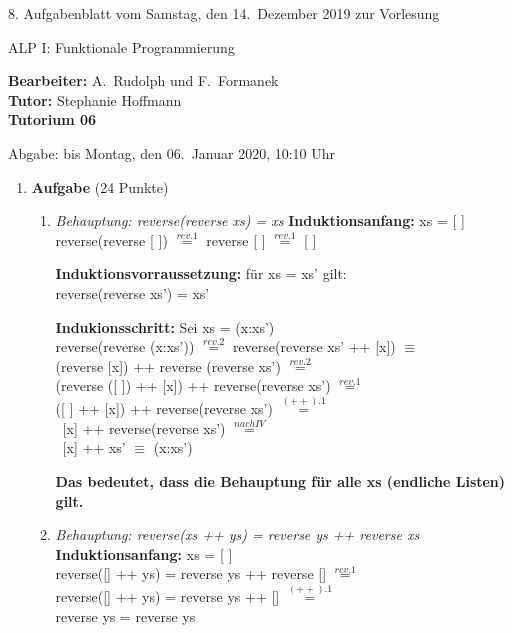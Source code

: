 \documentclass[11pt]{article}
\newcommand{\VORLESUNG}{ALP I: Funktionale Programmierung}
\newcommand{\STAFF}{A.\ Rudolph und F.\ Formanek}
\newcommand{\ASSIGNMENT}{8}
\newcommand{\HANDOUT}{Samstag, den 14.\ Dezember   2019}
\newcommand{\TUTOR}{Stephanie Hoffmann}
\newcommand{\DELIVER}{bis Montag, den 06.\ Januar 2020, 10:10 Uhr}
\newcommand{\punkte}[1]{{\small{ }(#1 Punkte)}}
\newcommand{\aufgabe}[1]{\item{\bf #1}}
\begin{document}
\begin{center}
\ASSIGNMENT{}. Aufgabenblatt vom \HANDOUT{} zur Vorlesung 
\vspace*{0.5cm}

{\Large \VORLESUNG{}}

\textbf{Bearbeiter:} \STAFF{}\\
\textbf{Tutor:} \TUTOR\\
\textbf{Tutorium 06}
\vspace*{0.5cm}

{\small Abgabe: \DELIVER{}}
\vspace*{1cm}
\end{center}
\begin{enumerate}
 \aufgabe{Aufgabe}\punkte{24}
\begin{enumerate}
\item
\textit{Behauptung: reverse(reverse xs) = xs}
\vspace*{0.5cm}
\newline
\textbf{Induktionsanfang:} xs = [ ]\\
reverse(reverse [ ]) $\stackrel{rev.1}{=}$ reverse [ ] $\stackrel{rev.1}{=}$ [ ]

\vspace*{0.5cm}
\textbf{Induktionsvorraussetzung:} für xs = xs' gilt:\\
reverse(reverse xs') = xs'

\vspace*{0.5cm}
\textbf{Indukionsschritt:} Sei xs = (x:xs')\\
reverse(reverse (x:xs')) $\stackrel{rev.2}{=}$ reverse(reverse xs' ++ [x]) $\equiv$\\
(reverse [x]) ++ reverse (reverse xs') $\stackrel{rev.2}{=}$\\  (reverse ([ ]) ++ [x]) ++ reverse(reverse xs') $\stackrel{rev.1}{=}$\\
([ ] ++ [x]) ++ reverse(reverse xs') $\stackrel{(++).1}{=}$\\
\ [x] ++ reverse(reverse xs') $\stackrel{nach IV}{=}$\\
\ [x] ++ xs' $\equiv$ (x:xs')

\vspace*{0.5cm}
\textbf{Das bedeutet, dass die Behauptung für alle xs (endliche Listen) gilt.}

\vspace*{0.5cm}
\item
\textit{Behauptung: reverse(xs ++ ys) = reverse ys ++ reverse xs}
\vspace*{0.5cm}
\newline
\textbf{Induktionsanfang:} xs = [ ]\\
reverse([] ++ ys) = reverse ys ++ reverse [] $\stackrel{rev.1}{=}$\\
reverse([] ++ ys) = reverse ys ++ [] $\stackrel{(++).1}{=}$\\
reverse ys = reverse ys


\end{enumerate}
\end{enumerate}
\end{document}

